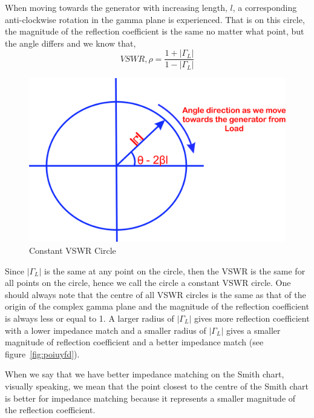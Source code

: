 When moving towards the generator with increasing length, $l$, a corresponding anti-clockwise rotation in the gamma plane is experienced. That is on this circle, the magnitude of the reflection coefficient is the same no matter what point, but the angle differs and we know that,
\begin{equation}
VSWR, \rho = \frac{1 + |\Gamma_L|}{1 - |\Gamma_L|}
\end{equation}
\begin{figure}[h]
\centering
\includegraphics[width=0.7\linewidth]{./graphics/lkjhgryn}
\caption{Constant VSWR Circle}
\label{fig:lkjhgryn}
\end{figure}

Since $|\Gamma_L|$ is the same at any point on the circle, then the VSWR is the same for all points on the circle, hence we call the circle a constant VSWR circle. 
One should always note that the centre of all VSWR circles is the same as that of the origin of the complex gamma plane and the magnitude of the reflection coefficient is always less or equal to 1. A larger radius of $|\Gamma_L|$ gives more reflection coefficient with a lower impedance match and a smaller radius of $|\Gamma_L|$ gives a smaller magnitude of reflection coefficient and a better impedance match (see figure~\ref{fig:poiuyfd}).

When we say that we have better impedance matching on the Smith chart, visually speaking, we mean that the point closest to the centre of the Smith chart is better for impedance matching because it represents a smaller magnitude of the reflection coefficient. 

